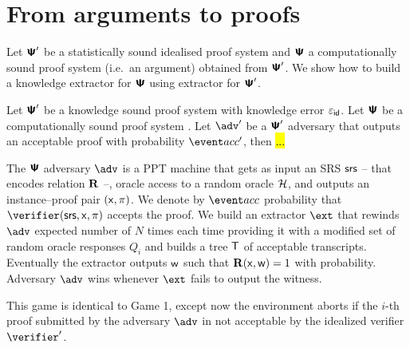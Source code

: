 
\section{From arguments to proofs}
\newcommand{\epsa}{\eps_{\mathsf{attema}}}
%
%
%
Let $\bm{\mathsf{\Psi}}'$ be a statistically sound idealised proof system and $\bm{\mathsf{\Psi}}$ a
computationally sound proof system (i.e.~an argument) obtained from $\bm{\mathsf{\Psi}}'$. We
show how to build a knowledge extractor for $\bm{\mathsf{\Psi}}$ using extractor for $\bm{\mathsf{\Psi}}'$.

\begin{lemma}
  Let $\bm{\mathsf{\Psi}}'$ be a knowledge sound proof system with knowledge error
  $\varepsilon_{\mathsf{id}}$. Let $\bm{\mathsf{\Psi}}$ be a computationally sound proof system . Let $\adv'$ be a $\bm{\mathsf{\Psi}}'$
  adversary that outputs an acceptable proof with probability $\accProb'$, then \hl{...}  
\end{lemma}


The $\bm{\mathsf{\Psi}}$ adversary $\adv$ is a PPT machine that gets as input an SRS $\mathsf{srs}$ --
that encodes relation $\mathbf{R}$ --, oracle access to a random oracle $\mathcal{H}$, and outputs an
instance--proof pair $(\mathsf{x}, \pi)$. We denote by $\accProb$ probability that
$\verifier (\srs, \inp, \zkproof)$ accepts the proof. We build an extractor $\ext$ that
rewinds $\adv$ expected number of $N$ times each time providing it with a modified set of
random oracle responses $Q_i$ and builds a tree $\mathsf{T}$ of acceptable transcripts.
Eventually the extractor outputs $\mathsf{w}$ such that $\mathbf{R}(\mathsf{x}, \mathsf{w}) = 1$ with
 probability.  Adversary $\adv$ wins whenever $\ext$ fails to
output the witness.

This game is identical to Game 1, except now the environment aborts if the $i$-th proof
submitted by the adversary $\adv$ in not acceptable by the idealized verifier
$\verifier'$.


